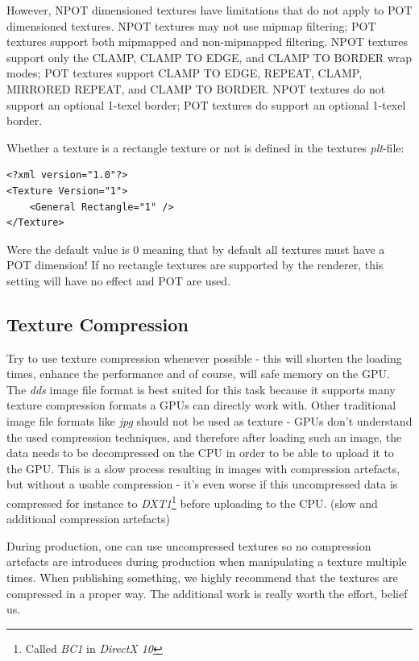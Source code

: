 However, \ac{NPOT} dimensioned textures have limitations that do not apply to \ac{POT} dimensioned textures. \ac{NPOT} textures may not use mipmap filtering; \ac{POT} textures support both mipmapped and non-mipmapped filtering. \ac{NPOT} textures support only the CLAMP, CLAMP TO EDGE, and CLAMP TO BORDER wrap modes; \ac{POT} textures support CLAMP TO EDGE, REPEAT, CLAMP, MIRRORED REPEAT, and CLAMP TO BORDER. \ac{NPOT} textures do not support an optional 1-texel border;
\ac{POT} textures do support an optional 1-texel border.

Whether a texture is a rectangle texture or not is defined in the textures \emph{plt}-file:

\begin{lstlisting}[caption=\emph{plt}-file rectangle texture setup]
<?xml version="1.0"?>
<Texture Version="1">
	<General Rectangle="1" />
</Texture>
\end{lstlisting}

Were the default value is 0 meaning that by default all textures must have a \ac{POT} dimension! If no rectangle textures are supported by the renderer, this setting will have no effect and \ac{POT} are used.




\subsection{Texture Compression}
Try to use texture compression whenever possible - this will shorten the loading times, enhance the performance and of course, will safe memory on the \ac{GPU}. The \emph{dds} image file format is best suited for this task because it supports many texture compression formats a \ac{GPU}s can directly work with. Other traditional image file formats like \emph{jpg} should not be used as texture - \ac{GPU}s don't understand the used compression techniques, and therefore after loading such an image, the data needs to be decompressed on the \ac{CPU} in order to be able to upload it to the \ac{GPU}. This is a slow process resulting in images with compression artefacts, but without a usable compression - it's even worse if this uncompressed data is compressed for instance to \emph{DXT1}\footnote{Called \emph{BC1} in \emph{DirectX 10}} before uploading to the \ac{CPU}. (slow and additional compression artefacts)

During production, one can use uncompressed textures so no compression artefacts are introduces during production when manipulating a texture multiple times. When publishing something, we highly recommend that the textures are compressed in a proper way. The additional work is really worth the effort, belief us.


